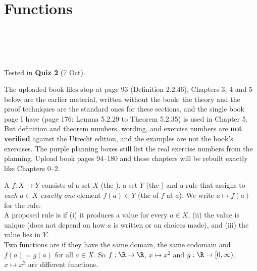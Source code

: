 \chapter{Functions}
%
{\\ \\ \\ \\ Tested in \textbf{Quiz 2} (7 Oct).}

\begin{warn}
The uploaded book files stop at page 93 (Definition 2.2.46). Chapters 3, 4 and 5 below are the earlier material, written without the book: the theory and the proof techniques are the standard ones for these sections, and the single book page I have (page 176: Lemma 5.2.29 to Theorem 5.2.35) is used in Chapter 5. But definition and theorem numbers, wording, and exercise numbers are \textbf{not verified} against the Utrecht edition, and the examples are not the book's exercises. The purple planning boxes still list the real exercise numbers from the planning. Upload book pages 94--180 and these chapters will be rebuilt exactly like Chapters 0--2.
\end{warn}


\begin{key}[Function]
A  $f:X\to Y$ consists of a set $X$ (the ), a set $Y$ (the ) and a rule that assigns to \emph{each} $a\in X$ \emph{exactly one} element $f(a)\in Y$ (the  of $f$ at $a$). We write $a\mapsto f(a)$ for the rule.\\
A proposed rule is  if (i) it produces a value for every $a\in X$, (ii) the value is unique (does not depend on how $a$ is written or on choices made), and (iii) the value lies in $Y$.\\
Two functions are  if they have the same domain, the same codomain and $f(a)=g(a)$ for all $a\in X$. So $f:\R\to\R$, $x\mapsto x^2$ and $g:\R\to[0,\infty)$, $x\mapsto x^2$ are different functions.
\end{key}

